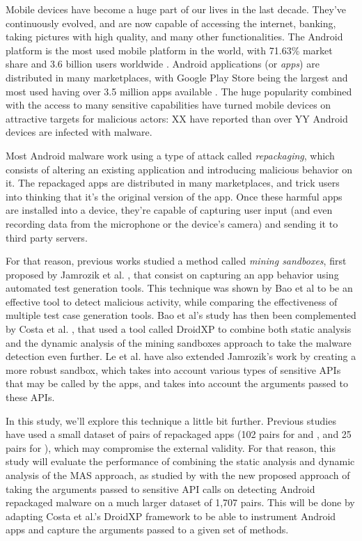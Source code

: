 Mobile devices have become a huge part of our lives in the last decade. They've continuously evolved, and are now capable of accessing the internet, banking, taking pictures with high quality, and many other functionalities. The Android platform is the most used mobile platform in the world, with 71.63\% market share and 3.6 billion users worldwide %
. Android applications (or \textit{apps}) are distributed in many marketplaces, with Google Play Store being the largest and most used having over 3.5 million apps available%
. The huge popularity combined with the access to many sensitive capabilities have turned mobile devices on attractive targets for malicious actors: XX have reported than over YY Android devices are infected with malware.

Most Android malware work using a type of attack called \textit{repackaging}, which consists of altering an existing application and introducing malicious behavior on it. The repackaged apps are distributed in many marketplaces, and trick users into thinking that it's the original version of the app. Once these harmful apps are installed into a device, they're capable of capturing user input (and even recording data from the microphone or the device's camera) and sending it to third party servers.

For that reason, previous works studied a method called \textit{mining sandboxes}, first proposed by Jamrozik et al. \cite{jamrozik_mining_2016}, that consist on capturing an app behavior using automated test generation tools. This technique was shown by Bao et al \cite{bao_mining_2018} to be an effective tool to detect malicious activity, while comparing the effectiveness of multiple test case generation tools. Bao et al's study has then been complemented by Costa et al. \cite{costa_exploring_2022}, that used a tool called DroidXP to combine both static analysis and the dynamic analysis of the mining sandboxes approach to take the malware detection even further. Le et al.  \cite{le_towards_2018} have also extended Jamrozik's work by creating a more robust sandbox, which takes into account various types of sensitive APIs that may be called by the apps, and takes into account the arguments passed to these APIs.

In this study, we'll explore this technique a little bit further. Previous studies have used a small dataset of pairs of repackaged apps (102 pairs for \cite{bao_mining_2018} and \cite{costa_exploring_2022}, and 25 pairs for \cite{le_towards_2018}), which may compromise the external validity. For that reason, this study will evaluate the performance of combining the static analysis and dynamic analysis of the MAS approach, as studied by \cite{costa_exploring_2022} with the new proposed approach of taking the arguments passed to sensitive API calls on detecting Android repackaged malware on a much larger dataset of 1,707 pairs. This will be done by adapting Costa et al.'s DroidXP \cite{costa_droidxp_2020} framework to be able to instrument Android apps and capture the arguments passed to a given set of methods.

